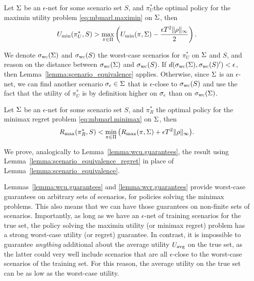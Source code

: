 \begin{lemma}
    \label{lemma:wcu.guarantees}
    Let $\Sigma$ be an $\epsilon$-net for some scenario set $S$, and $\pi^*_U$the optimal policy for the maximin utility problem \eqref{eq:mbmarl.maximin} on $\Sigma$, then
    \begin{equation}
        U_\text{min}(\pi^*_U, S) > \max_{\pi \in \Pi} \left( U_\text{min}(\pi, \Sigma) - \dfrac{\epsilon T^2 \lVert \rho \rVert_\infty}{2} \right). 
    \end{equation}
\end{lemma}
\begin{proofsketch}
    We denote $\sigma_\text{wc}(\Sigma)$ and $\sigma_\text{wc}(S)$ the worst-case scenarios for $\pi^*_U$ on $\Sigma$ and $S$, and reason on the distance between $\sigma_\text{wc}(\Sigma)$ and $\sigma_\text{wc}(S)$. If $d(\sigma_\text{wc}(\Sigma),\sigma_\text{wc}(S)') < \epsilon$, then Lemma~\ref{lemma:scenario_equivalence} applies.  Otherwise, since $\Sigma$ is an $\epsilon$-net, we can find another scenario $\sigma_\epsilon \in \Sigma$ that is $\epsilon$-close to $\sigma_\text{wc}(S)$ and use the fact that the utility of $\pi^*_U$ is by definition higher on $\sigma_\epsilon$ than on $\sigma_\text{wc}(\Sigma)$.
\end{proofsketch}

\begin{lemma}
    \label{lemma:wcr.guarantees}
    Let $\Sigma$ be an $\epsilon$-net for some scenario set $S$, and $\pi^*_R$ the optimal policy for the minimax regret problem \eqref{eq:mbmarl.minimax} on $\Sigma$, then
    \begin{equation}
        R_\text{max}(\pi^*_R, S) < \min_{\pi \in \Pi} \big( R_\text{max}(\pi, \Sigma) + \epsilon T^2 \lVert \rho \rVert_\infty \big).
    \end{equation}
\end{lemma}
\begin{proofsketch}
        We prove, analogically to Lemma~\ref{lemma:wcu.guarantees}, the result using Lemma~\ref{lemma:scenario_equivalence_regret} in place of Lemma~\ref{lemma:scenario_equivalence}.
\end{proofsketch}

Lemmas~\ref{lemma:wcu.guarantees} and \ref{lemma:wcr.guarantees} provide worst-case guarantees on arbitrary sets of scenarios, for policies solving the minimax problems. This also means that we can have those guarantees on non-finite sets of scenarios. Importantly, as long as we have an $\epsilon$-net of training scenarios for the true set, the policy solving the maximin utility (or minimax regret) problem has a strong worst-case utility (or regret) guarantee. In contrast, it is impossible to guarantee \emph{anything} additional about the average utility $U_\text{avg}$ on the true set, as the latter could very well include scenarios that are all $\epsilon$-close to the worst-case scenarios of the training set. For this reason, the average utility on the true set can be as low as the worst-case utility.
